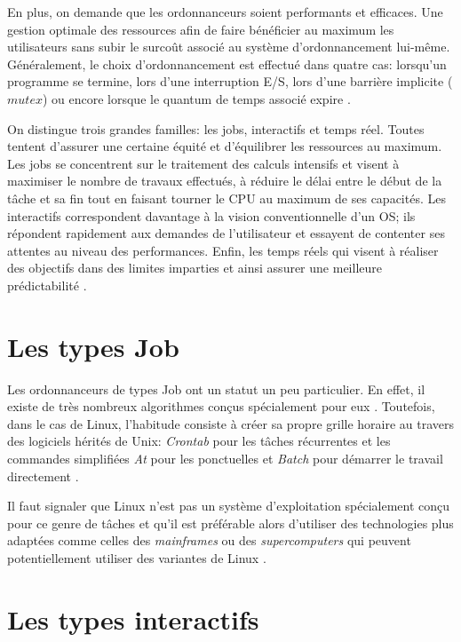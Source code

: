 \documentclass[letterpaper]{article}
\begin{document}
En plus, on demande que les ordonnanceurs soient performants et efficaces. Une gestion optimale des ressources afin de faire bénéficier au maximum les utilisateurs sans subir le surcoût associé au système d'ordonnancement lui-même. Généralement, le choix d'ordonnancement est effectué dans quatre cas: lorsqu'un programme se termine, lors d'une interruption E/S, lors d'une barrière implicite ($mutex$) ou encore lorsque le quantum de temps associé expire \citep{Bovet:2005:ULK:1077084}.

On distingue trois grandes familles: les jobs, interactifs et temps réel. Toutes tentent d'assurer une certaine équité et d'équilibrer les ressources au maximum. Les jobs se concentrent sur le traitement des calculs intensifs et visent à maximiser le nombre de travaux effectués, à réduire le délai entre le début de la tâche et sa fin tout en faisant tourner le CPU au maximum de ses capacités. Les interactifs correspondent davantage à la vision conventionnelle d'un OS; ils répondent rapidement aux demandes de l'utilisateur et essayent de contenter ses attentes au niveau des performances. Enfin, les temps réels qui visent à réaliser des objectifs dans des limites imparties et ainsi assurer une meilleure prédictabilité \citep{Tanenbaum:2005:OSD:1076555}.

\section{Les types Job}

Les ordonnanceurs de types Job ont un statut un peu particulier. En effet, il existe de très nombreux algorithmes conçus spécialement pour eux \citep{journals/cce/MendezCGHF06}. Toutefois, dans le cas de Linux, l'habitude consiste à créer sa propre grille horaire au travers des logiciels hérités de Unix: \textit{Crontab} pour les tâches récurrentes et les commandes simplifiées \textit{At} pour les ponctuelles et \textit{Batch} pour démarrer le travail directement \citep{x1994x}.

Il faut signaler que Linux n'est pas un système d'exploitation spécialement conçu pour ce genre de tâches et qu'il est préférable alors d'utiliser des technologies plus adaptées comme celles des \textit{mainframes} ou des \textit{supercomputers} qui peuvent potentiellement utiliser des variantes de Linux \citep{Encyclopedia:2011}.

\section{Les types interactifs}
\end{document}
